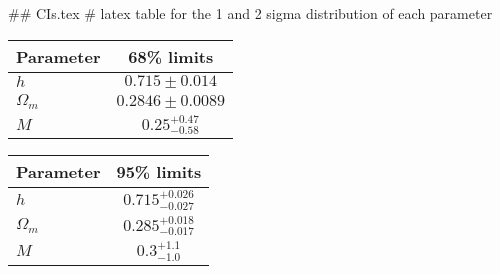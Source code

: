 ## CIs.tex
# latex table for the 1 and 2 sigma distribution of each parameter

\begin{tabular} { l  c}
 Parameter &  68\% limits\\
\hline
{\boldmath$h              $} & $0.715\pm 0.014            $\\
{\boldmath$\Omega_m       $} & $0.2846\pm 0.0089          $\\
{\boldmath$M              $} & $0.25^{+0.47}_{-0.58}      $\\
\hline
\end{tabular}

\begin{tabular} { l  c}
 Parameter &  95\% limits\\
\hline
{\boldmath$h              $} & $0.715^{+0.026}_{-0.027}   $\\
{\boldmath$\Omega_m       $} & $0.285^{+0.018}_{-0.017}   $\\
{\boldmath$M              $} & $0.3^{+1.1}_{-1.0}         $\\
\hline
\end{tabular}
